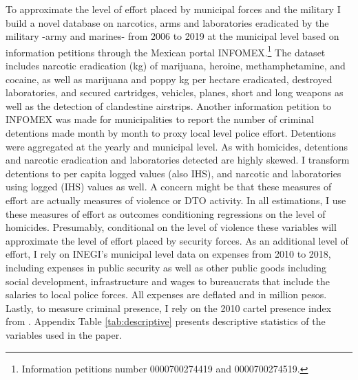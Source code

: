 \documentclass[12pt]{amsart}
\makeatletter
\def\subsection{\@startsection{subsection}{2}
	\z@{.8\linespacing\@plus.7\linespacing}{.7\linespacing}{\large}}
\numberwithin{equation}{section}
\theoremstyle{definition}
\theoremstyle{definition}
\theoremstyle{definition}
\makeatother
\begin{document}
To approximate the level of effort placed by municipal forces and the military I build a novel database on narcotics, arms and laboratories eradicated by the military -army and marines- from 2006 to 2019 at the municipal level  based on information petitions through the Mexican portal INFOMEX.\footnote{Information petitions number 0000700274419 and 0000700274519.} The dataset includes narcotic eradication (kg) of marijuana, heroine, methamphetamine, and cocaine, as well as marijuana and poppy kg per hectare eradicated, destroyed laboratories, and secured cartridges, vehicles, planes, short and long weapons as well as the detection of clandestine airstrips.  Another information petition to INFOMEX was made for municipalities to report the number of criminal detentions made month by month to proxy local level police effort. Detentions were aggregated at the yearly and municipal level. As with homicides, detentions and narcotic eradication and laboratories detected are highly skewed. I transform detentions to per capita logged values (also IHS), and narcotic and laboratories using logged (IHS) values as well. A concern might be that these measures of effort are actually measures of violence or DTO activity. In all estimations, I use these measures of effort as outcomes conditioning regressions on the level of homicides. Presumably, conditional on the level of violence these variables will approximate the level of effort placed by security forces. As an additional level of effort,  I rely on INEGI's municipal level data on expenses from 2010 to 2018, including expenses in public security as well as other public goods including social development, infrastructure and wages to bureaucrats that include the salaries to local police forces. All expenses are deflated and in million pesos. Lastly, to measure criminal presence, I rely on the 2010 cartel presence index from \citet{camilo_etal_2018}. 
 Appendix Table \ref{tab:descriptive} presents descriptive statistics of the variables used in the paper.

\subsection{Empirical Specification \label{sec:design}}  
\end{document}
